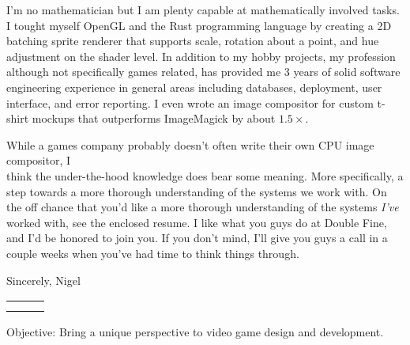 \documentclass[12pt]{article}
\def \author{Nigel Baillie}
\renewcommand{\section}[1]{{\Huge{#1}}\vspace{2 mm}}
\begin{document}
I'm no mathematician but I am plenty capable at mathematically involved
tasks. I tought myself OpenGL and the Rust programming language by creating
a 2D batching sprite renderer that supports scale, rotation about a point, and
hue adjustment on the shader level. In addition to my hobby projects, my profession
although not specifically games related, has provided me 3 years of solid
software engineering experience in general areas including databases, deployment, user
interface, and error reporting. I even wrote an image compositor for custom t-shirt
mockups that outperforms ImageMagick by about $1.5\times$.
\newline

While a games company probably doesn't often write their own CPU image compositor,
I \\ think the under-the-hood knowledge does bear some meaning. More specifically,
a step towards a more thorough understanding of the systems we work with.
On the off chance that you'd like a more thorough understanding of the systems
\textit{I've} worked with, see the enclosed resume. I like what you guys do at
Double Fine, and I'd be honored to join you. If you don't mind, I'll give you guys
a call in a couple weeks when you've had time to think things through.
\newline

Sincerely,
\newline
Nigel


\pagebreak



\begin{tabular} {
  p{}
  p{}
  p{}
}
  \begin{flushleft}
  \end{flushleft}
  &
  \begin{center}
    {\Huge{\author}}\\
  \end{center}
  &
  \begin{flushright}
  \end{flushright}
\end{tabular}

\section{Objective:} Bring a unique perspective to video game design and development.
\newline
\end{document}
